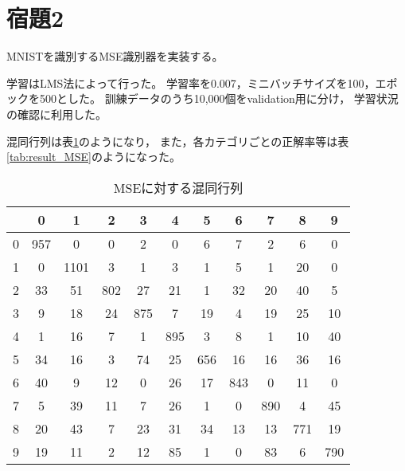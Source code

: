 \documentclass[class=jsarticle, crop=false, dvipdfmx, fleqn]{standalone}
\begin{document}
\section*{宿題2}

MNISTを識別するMSE識別器を実装する。

学習はLMS法によって行った。
学習率を0.007，ミニバッチサイズを100，エポックを500とした。
訓練データのうち10,000個をvalidation用に分け，
学習状況の確認に利用した。

混同行列は表\ref{tab:confusion_matrix_MSE}のようになり，
また，各カテゴリごとの正解率等は表\ref{tab:result_MSE}のようになった。

\begin{table}[H]
	\centering
	\caption{MSEに対する混同行列}
	\begin{tabular}{|c||cccccccccc|} \hline
			& 0 & 1 & 2 & 3 & 4 & 5 & 6 & 7 & 8 & 9 \\ \hline\hline
        0     & 957 & 0 & 0 & 2 & 0 & 6 & 7 & 2 & 6 & 0 \\
        1     & 0 & 1101 & 3 & 1 & 3 & 1 & 5 & 1 & 20 & 0 \\
        2     & 33 & 51 & 802 & 27 & 21 & 1 & 32 & 20 & 40 & 5 \\
        3     & 9 & 18 & 24 & 875 & 7 & 19 & 4 & 19 & 25 & 10 \\
        4     & 1 & 16 & 7 & 1 & 895 & 3 & 8 & 1 & 10 & 40 \\
        5     & 34 & 16 & 3 & 74 & 25 & 656 & 16 & 16 & 36 & 16 \\
        6     & 40 & 9 & 12 & 0 & 26 & 17 & 843 & 0 & 11 & 0 \\
        7     & 5 & 39 & 11 & 7 & 26 & 1 & 0 & 890 & 4 & 45 \\
        8     & 20 & 43 & 7 & 23 & 31 & 34 & 13 & 13 & 771 & 19 \\
        9     & 19 & 11 & 2 & 12 & 85 & 1 & 0 & 83 & 6 & 790 \\
		\hline
	\end{tabular}
	\label{tab:confusion_matrix_MSE}
\end{table}
\end{document}
